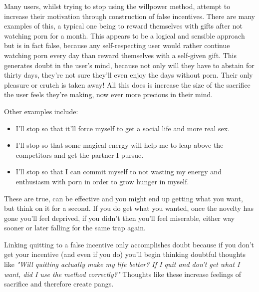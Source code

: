 \documentclass[easypeasy.tex]{subfiles}
\begin{document}
Many users, whilst trying to stop using the willpower method, attempt to increase their motivation through construction of false incentives. There are many examples of this, a typical one being to reward themselves with gifts after not watching porn for a month. This appears to be a logical and sensible approach but is in fact false, because any self-respecting user would rather continue watching porn every day than reward themselves with a self-given gift. This generates doubt in the user's mind, because not only will they have to abstain for thirty days, they're not sure they'll even enjoy the days without porn. Their only pleasure or crutch is taken away! All this does is increase the size of the sacrifice the user feels they're making, now ever more precious in their mind.

Other examples include:
\begin{itemize}
  \item I'll stop so that it'll force myself to get a social life and more real sex.
  \item I'll stop so that some magical energy will help me to leap above the competitors and get the partner I pursue.
  \item I'll stop so that I can commit myself to not wasting my energy and enthusiasm with porn in order to grow hunger in myself.
\end{itemize}

These are true, can be effective and you might end up getting what you want, but think on it for a second. If you do get what you wanted, once the novelty has gone you'll feel deprived, if you didn't then you'll feel miserable, either way sooner or later falling for the same trap again.

Linking quitting to a false incentive only accomplishes doubt because if you don't get your incentive (and even if you do) you'll begin thinking doubtful thoughts like \textit{"Will quitting actually make my life better? If I quit and don't get what I want, did I use the method correctly?"} Thoughts like these increase feelings of sacrifice and therefore create pangs.
\end{document}
